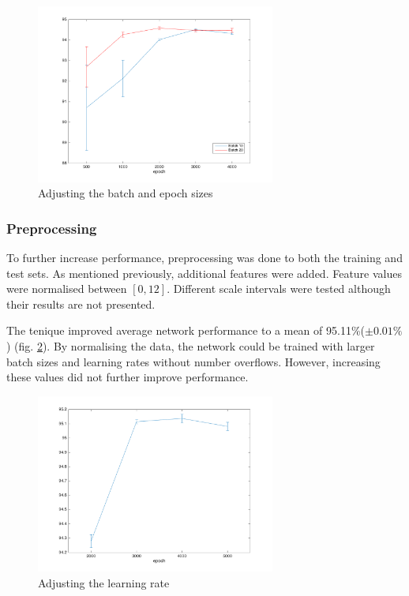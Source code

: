\documentclass[11]{article}
\begin{document}
\begin{figure}[h]
\centering
\includegraphics[width=0.7\textwidth]{batchandepoch.png}
\caption{Adjusting the batch and epoch sizes}
\label{fig:batchandepoch}
\end{figure}

\subsubsection{Preprocessing}
To further increase performance, preprocessing was done to both the training and test sets. As mentioned previously, additional features were added. Feature values were normalised between $[0,12]$. Different scale intervals were tested although their results are not presented. 

The tenique improved average network performance to a mean of 95.11\%($\pm 0.01\%$) (fig. \ref{fig:normalised}). By normalising the data, the network could be trained with larger batch sizes and learning rates without number overflows. However, increasing these values did not further improve performance. 

\begin{figure}[h]
\centering
\includegraphics[width=0.7\textwidth]{normalised.png}
\caption{Adjusting the learning rate}
\label{fig:normalised}
\end{figure}
\end{document}
